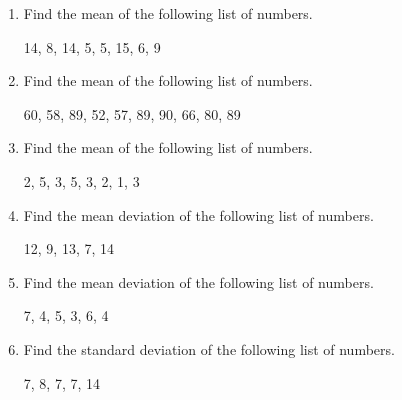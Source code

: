 \documentclass{article}
\begin{document}
\ActivityTitle[class=Statistics, number=1, name={Basic Parameters}]

\begin{enumerate}
\item Find the mean of the following list of numbers.

\begin{center}
14, 8, 14, 5, 5, 15, 6, 9
\end{center}



  
\vspace{5cm}

\item Find the mean of the following list of numbers.

\begin{center}
60, 58, 89, 52, 57, 89, 90, 66, 80, 89
\end{center}



  
\vspace{5cm}

\item Find the mean of the following list of numbers.

\begin{center}
2, 5, 3, 5, 3, 2, 1, 3
\end{center}



  
\vspace{5cm}

\item Find the mean deviation of the following list of numbers.

\begin{center}
12, 9, 13, 7, 14
\end{center}



  
\vspace{5cm}

\item Find the mean deviation of the following list of numbers.

\begin{center}
7, 4, 5, 3, 6, 4
\end{center}



  
\vspace{5cm}

\item Find the standard deviation of the following list of numbers.

\begin{center}
7, 8, 7, 7, 14
\end{center}




\end{enumerate}
\end{document}

